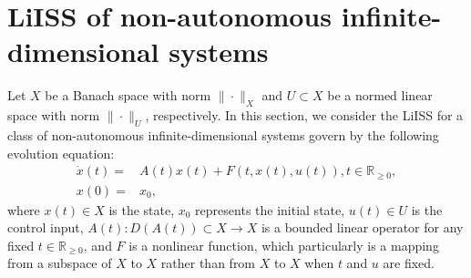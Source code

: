 \documentclass[onecolumn]{autart}
\newenvironment{proof of Prop.ODE}{{\it Proof of Proposition~\ref{Prop.ODE}:\enspace}}{\hfill $\blacksquare$\par}
\newenvironment{proof of PDE}{{\it Proof of Proposition \ref{Prop.8}:\enspace}}{\hfill $\blacksquare$\par}
\begin{document}
{\section{{LiISS} of non-autonomous infinite-dimensional systems}\label{Section-2}

Let $ X $  be  a Banach space with   norm $\|\cdot\|_{ X }$ and $ U\subset  X $ be a normed linear space with  norm {$\|\cdot\|_{U}$}, respectively. %
In this section, we consider the LiISS for a class of non-autonomous infinite-dimensional systems  govern by the following   evolution equation:
\begin{subequations}\label{systems}
	\begin{align}
		\dot{x}(t)= & A(t)x(t)+F(t, x(t), u(t)),  t\in\mathbb{R}_{\geq0}, \label{systems-a}\\
		x(0)= & x_0,  \label{systems-b}
	\end{align}
\end{subequations}
{where $x(t)\in  X $ is the state, $x_0$ represents the initial state, $u(t)\in  U$ is the control input,   $A(t):D(A(t))\subset  X  \to  X $ is a bounded linear operator for any fixed $t\in \mathbb{R}_{\geq 0}$, and $F$ is a nonlinear  function, which  particularly  is a  mapping from a {subspace} of $X$  to $X$ rather than from $X$ to $X$ when $t$ and $u$ are fixed.}

}
\end{document}
